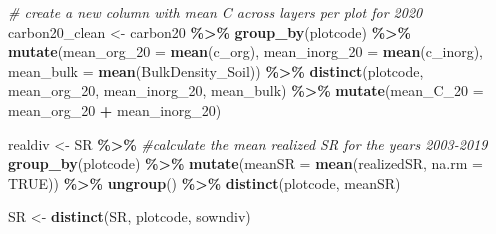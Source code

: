\documentclass[
]{article}
\newenvironment{Shaded}{\begin{snugshade}}{\end{snugshade}}
\newcommand{\AttributeTok}[1]{\textcolor[rgb]{0.13,0.29,0.53}{#1}}
\newcommand{\CommentTok}[1]{\textcolor[rgb]{0.56,0.35,0.01}{\textit{#1}}}
\newcommand{\ConstantTok}[1]{\textcolor[rgb]{0.56,0.35,0.01}{#1}}
\newcommand{\FunctionTok}[1]{\textcolor[rgb]{0.13,0.29,0.53}{\textbf{#1}}}
\newcommand{\NormalTok}[1]{#1}
\newcommand{\OtherTok}[1]{\textcolor[rgb]{0.56,0.35,0.01}{#1}}
\newcommand{\SpecialCharTok}[1]{\textcolor[rgb]{0.81,0.36,0.00}{\textbf{#1}}}
\begin{document}
\begin{Shaded}
\begin{Highlighting}[]
\CommentTok{\# create a new column with mean C across layers per plot for 2020}
\NormalTok{carbon20\_clean }\OtherTok{\textless{}{-}}\NormalTok{ carbon20 }\SpecialCharTok{\%\textgreater{}\%} \FunctionTok{group\_by}\NormalTok{(plotcode) }\SpecialCharTok{\%\textgreater{}\%} 
                      \FunctionTok{mutate}\NormalTok{(}\AttributeTok{mean\_org\_20 =} \FunctionTok{mean}\NormalTok{(c\_org), }\AttributeTok{mean\_inorg\_20 =} \FunctionTok{mean}\NormalTok{(c\_inorg), }\AttributeTok{mean\_bulk =} \FunctionTok{mean}\NormalTok{(BulkDensity\_Soil)) }\SpecialCharTok{\%\textgreater{}\%}
                      \FunctionTok{distinct}\NormalTok{(plotcode, mean\_org\_20, mean\_inorg\_20, mean\_bulk) }\SpecialCharTok{\%\textgreater{}\%} 
                      \FunctionTok{mutate}\NormalTok{(}\AttributeTok{mean\_C\_20 =}\NormalTok{ mean\_org\_20 }\SpecialCharTok{+}\NormalTok{ mean\_inorg\_20)}
\end{Highlighting}
\end{Shaded}

\begin{Shaded}
\begin{Highlighting}[]
\NormalTok{realdiv }\OtherTok{\textless{}{-}}\NormalTok{ SR }\SpecialCharTok{\%\textgreater{}\%}                    \CommentTok{\#calculate the mean realized SR for the years 2003{-}2019}
  \FunctionTok{group\_by}\NormalTok{(plotcode) }\SpecialCharTok{\%\textgreater{}\%} 
  \FunctionTok{mutate}\NormalTok{(}\AttributeTok{meanSR =} \FunctionTok{mean}\NormalTok{(realizedSR, }\AttributeTok{na.rm =} \ConstantTok{TRUE}\NormalTok{)) }\SpecialCharTok{\%\textgreater{}\%} 
  \FunctionTok{ungroup}\NormalTok{() }\SpecialCharTok{\%\textgreater{}\%}
  \FunctionTok{distinct}\NormalTok{(plotcode, meanSR)}

\NormalTok{SR }\OtherTok{\textless{}{-}} \FunctionTok{distinct}\NormalTok{(SR, plotcode, sowndiv)}
\end{Highlighting}
\end{Shaded}
\end{document}
